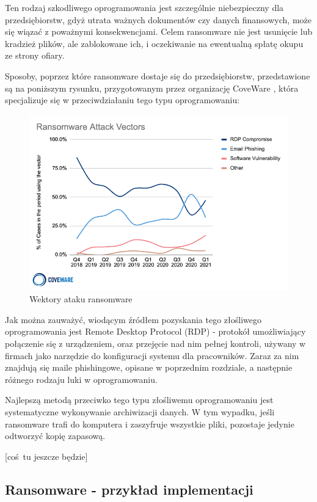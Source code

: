 \documentclass[12pt,twoside]{article}
\begin{document}
Ten rodzaj szkodliwego oprogramowania jest szczególnie niebezpieczny dla przedsiębiorstw, gdyż utrata ważnych dokumentów czy danych finansowych, może się wiązać z poważnymi konsekwencjami. Celem ransomware nie jest usunięcie lub kradzież plików, ale zablokowane ich, i oczekiwanie na ewentualną spłatę okupu ze strony ofiary. 

Sposoby, poprzez które ransomware dostaje się do przedsiębiorstw, przedstawione są na poniższym rysunku, przygotowanym przez organizację CoveWare \cite{RansomwareAttackVectors}, która specjalizuje się w przeciwdziałaniu tego typu oprogramowaniu:
\begin{figure}[ht]
	\centering
	\includegraphics[width=13cm]{figures/ransomware-attack-vectors.png}
	\caption{Wektory ataku ransomware}
	\label{Fig:Wektory ataku ransomware}
\end{figure} 

Jak można zauważyć, wiodącym źródłem pozyskania tego złośliwego oprogramowania jest Remote Desktop Protocol (RDP) \cite{RDP} - protokół umożliwiający połączenie się z urządzeniem, oraz przejęcie nad nim pełnej kontroli, używany w firmach jako narzędzie do konfiguracji systemu dla pracowników. Zaraz za nim znajdują się maile phishingowe, opisane w poprzednim rozdziale, a następnie różnego rodzaju luki w oprogramowaniu. 

Najlepszą metodą przeciwko tego typu złośliwemu oprogramowaniu jest systematyczne wykonywanie archiwizacji danych. W tym wypadku, jeśli ransomware trafi do komputera i zaszyfruje wszystkie pliki, pozostaje jedynie odtworzyć kopię zapasową.

[coś tu jeszcze będzie]

\subsection{Ransomware - przykład implementacji}
\end{document}
